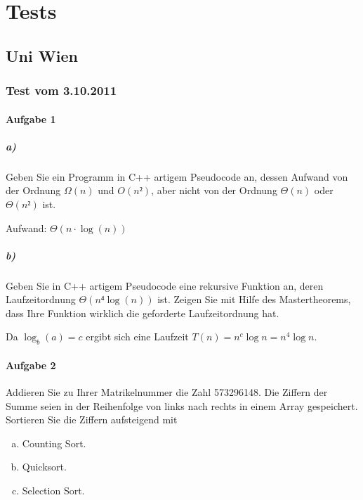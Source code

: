 \documentclass[a4paper, 12pt]{article}
\begin{document}
\section{Tests}

\subsection{Uni Wien}

\subsubsection{Test vom 3.10.2011}

\paragraph{Aufgabe 1}

\subparagraph{a)} Geben Sie ein Programm in C++ artigem Pseudocode an, dessen Aufwand von der Ordnung $Ω(n)$ und $O(n²)$, aber nicht von der Ordnung $Θ(n)$ oder $Θ(n²)$ ist.

\begin{leftbar}
	
\end{leftbar}

Aufwand: $Θ\left(n·\log\left(n\right)\right)$

\subparagraph{b)}

Geben Sie in C++ artigem Pseudocode eine rekursive Funktion an, deren Laufzeitordnung $Θ\left( n⁴ \log \left( n \right) \right)$ ist. Zeigen Sie mit Hilfe des Mastertheorems, dass Ihre Funktion wirklich die geforderte Laufzeitordnung hat.

\begin{leftbar}
	
\end{leftbar}

Da $\log_b (a) = c$ ergibt sich eine Laufzeit $T(n) = n^c \log n = n^4 \log n$.

\paragraph{Aufgabe 2}

Addieren Sie zu Ihrer Matrikelnummer die Zahl 573296148. Die Ziffern der Summe seien in der Reihenfolge von links nach rechts in einem Array gespeichert. Sortieren Sie die Ziffern aufsteigend mit

\begin{enumerate}[a.]
	\item Counting Sort.
	\item Quicksort.
	\item Selection Sort.
\end{enumerate}
\end{document}
